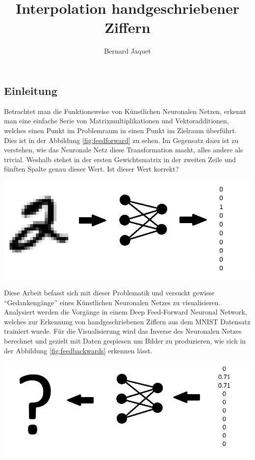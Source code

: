 \documentclass[a4paper,10pt]{article}
\title{Interpolation handgeschriebener Ziffern}
\author{Bernard Jaquet}
\date{\formatdate{12}{11}{2018}}
\newenvironment{Figure}
{\par\medskip\noindent\minipage{\linewidth}}
{\endminipage\par\medskip}
\begin{document}
	\maketitle
	\begin{multicols}{2}
		\begin{abstract}
			
		\end{abstract}
		\section{Einleitung}
		Betrachtet man die Funktionsweise von Künstlichen Neuronalen Netzen, erkennt man eine einfache Serie von Matrixmultiplikationen und Vektoradditionen, welches einen Punkt im Problemraum in einen Punkt im Zielraum überführt. Dies ist in der Abbildung \ref{fig:feedforward} zu sehen. Im Gegensatz dazu ist zu verstehen, wie das Neuronale Netz diese Transformation macht, alles andere als trivial. Weshalb stehet in der ersten Gewichtsmatrix in der zweiten Zeile und fünften Spalte genau dieser Wert. Ist dieser Wert korrekt?
		\begin{Figure}
			\centering
			\includegraphics[width=\linewidth]{img/scribble_forward_feed.png}
			\label{fig:feedforward}
		\end{Figure}
		Diese Arbeit befasst sich mit dieser Problematik und versucht gewisse ``Gedankengänge'' eines Künstlichen Neuronalen Netzes zu visualisieren. Analysiert werden die Vorgänge in einem Deep Feed-Forward Neuronal Network, welches zur Erkennung von handgeschriebenen Ziffern aus dem MNIST Datensatz trainiert wurde. Für die Visualisierung wird das Inverse des Neuronalen Netzes berechnet und gezielt mit Daten gespiesen um Bilder zu produzieren, wie sich in der Abbildung \ref{fig:feedbackwards} erkennen lässt.
		\begin{Figure}
			\centering
			\includegraphics[width=\linewidth]{img/scribble_reverse_feed.png}

\end{Figure}
\end{multicols}
\end{document}
